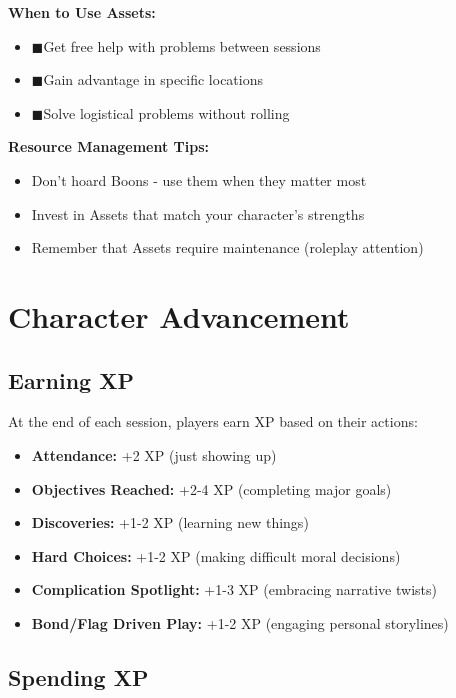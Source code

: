 \documentclass[11pt]{article}
\newcommand{\asset}{\textcolor{assetcolor}{$\blacksquare$}}
\begin{document}
\textbf{When to Use Assets:}
\begin{itemize}
\item \asset Get free help with problems between sessions
\item \asset Gain advantage in specific locations
\item \asset Solve logistical problems without rolling
\end{itemize}

\textbf{Resource Management Tips:}
\begin{itemize}
\item Don't hoard Boons - use them when they matter most
\item Invest in Assets that match your character's strengths
\item Remember that Assets require maintenance (roleplay attention)
\end{itemize}

\section{Character Advancement}

\subsection{Earning XP}

At the end of each session, players earn XP based on their actions:
\begin{itemize}
\item \textbf{Attendance:} +2 XP (just showing up)
\item \textbf{Objectives Reached:} +2-4 XP (completing major goals)
\item \textbf{Discoveries:} +1-2 XP (learning new things)
\item \textbf{Hard Choices:} +1-2 XP (making difficult moral decisions)
\item \textbf{Complication Spotlight:} +1-3 XP (embracing narrative twists)
\item \textbf{Bond/Flag Driven Play:} +1-2 XP (engaging personal storylines)
\end{itemize}

\subsection{Spending XP}
\end{document}

